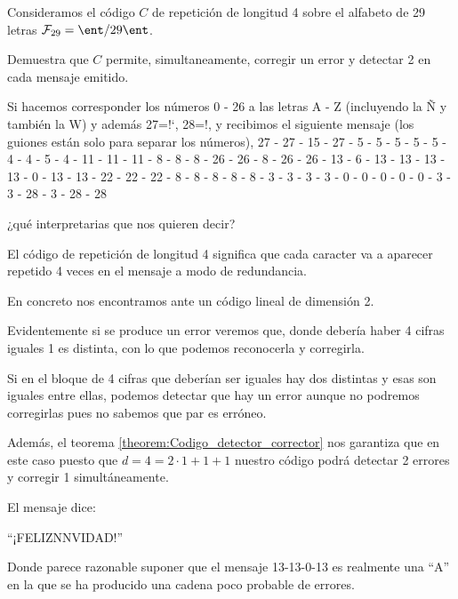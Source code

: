 \begin{problem}[9] Consideramos el código $C$ de repetición de longitud 4 sobre
el alfabeto de 29 letras $\mathcal{F}_{29}=\ent/{29}\ent$.

\ppart Demuestra que $C$ permite, simultaneamente, corregir un error y
detectar 2 en cada mensaje emitido.

\ppart Si hacemos corresponder los números 0 - 26 a las letras A - Z
(incluyendo la Ñ y también la W) y además 27=!`, 28=!, y recibimos
el siguiente mensaje (los guiones están solo para separar los
números), 27 - 27 - 15 - 27 - 5 - 5 - 5 - 5 - 5 - 4 - 4 - 5 - 4 -
11 - 11 - 11 - 8 - 8 - 8 - 26 - 26 - 8 - 26 - 26 - 13 - 6 - 13 -
13 - 13 - 13 - 0 - 13 - 13 - 22 - 22 - 22 - 8 - 8 - 8 - 8 -
 8 - 3 - 3 - 3 - 3 - 0 - 0 - 0 - 0 - 0 - 3 - 3 - 28 - 3 - 28 - 28

¿qué interpretarias que nos quieren decir?
\solution

\spart
El código de repetición de longitud 4 significa que cada caracter va a aparecer repetido 4 veces en el mensaje a modo de redundancia.

En concreto nos encontramos ante un código lineal de dimensión 2.

Evidentemente si se produce un error veremos que, donde debería haber 4 cifras iguales 1 es distinta, con lo que podemos reconocerla y corregirla.

Si en el bloque de 4 cifras que deberían ser iguales hay dos distintas y esas son iguales entre ellas, podemos detectar que hay un error aunque no podremos corregirlas pues no sabemos que par es erróneo.

Además, el teorema \ref{theorem:Codigo_detector_corrector} nos garantiza que en este caso puesto que $d=4=2\cdot 1+1+1$ nuestro código podrá detectar 2 errores y corregir 1 simultáneamente.

\spart


El mensaje dice:

``¡FELIZNNVIDAD!''

Donde parece razonable suponer que el mensaje 13-13-0-13 es realmente una ``A'' en la que se ha producido una cadena poco probable de errores.
\end{problem}

